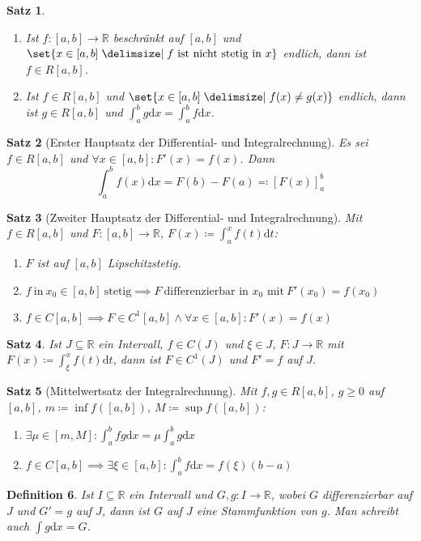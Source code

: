 \documentclass[a4paper]{article}
\newcounter{Sec}
\theoremstyle{marginbreak}
\newtheorem{definition}{Definition}[Sec]
\newtheorem{satz}[definition]{Satz}
\renewcommand{\d}[1]{\mathrm{d}#1}
\begin{document}
	\begin{satz}
		\begin{enumerate}[label=(\alph*)]
			\item Ist $f\colon[a,b]\to\mathbb{R}$ beschränkt auf $[a,b]$ und
				$\set{x\in[a,b]\given f~\text{ist nicht stetig in}~x}$ endlich,
				dann ist $f\in R[a,b]$.
			\item Ist $f\in R[a,b]$ und $\set{x\in[a,b]\given f(x)\neq g(x)}$ endlich,
			dann ist $g\in R[a,b]$ und $\int_a^bg\d{x}=\int_a^bf\d{x}$.
		\end{enumerate}
	\end{satz}
	\begin{satz}[Erster Hauptsatz der Differential- und Integralrechnung]
		Es sei $f\in R[a,b]$ und $\forall x\in [a,b]:F'(x)=f(x)$. Dann
		\[ \int_a^bf(x)\d{x}=F(b)-F(a)\eqqcolon [F(x)]_a^b \]
	\end{satz}
	\begin{satz}[Zweiter Hauptsatz der Differential- und Integralrechnung]
		Mit $f\in R[a,b]$ und $F\colon[a,b]\to\mathbb{R}$, $F(x)\coloneqq\int_a^xf(t)\d{t}$:
		\begin{enumerate}[label=(\alph*)]
			\item $F$ ist auf $[a,b]$ Lipschitzstetig.
			\item $f~\text{in}~x_0\in[a,b]~\text{stetig}\implies F~\text{differenzierbar in $x_0$ mit}~F'(x_0)=f(x_0)$
			\item $f\in C[a,b]\implies F\in C^1[a,b]\wedge\forall x\in[a,b]:F'(x)=f(x)$
		\end{enumerate}
	\end{satz}
	\begin{satz}
		Ist $J\subseteq\mathbb{R}$ ein Intervall, $f\in C(J)$ und $\xi\in J$,
		$F\colon J\to\mathbb{R}$ mit $F(x)\coloneqq\int_\xi^xf(t)\d{t}$, dann ist
		$F\in C^1(J)$ und $F'=f$ auf $J$.
	\end{satz}
	\begin{satz}[Mittelwertsatz der Integralrechnung]
		Mit $f,g\in R[a,b]$, $g\geq0$ auf $[a,b]$, $m\coloneqq\inf f([a,b])$,
		$M\coloneqq\sup f([a,b])$:
		\begin{enumerate}[label=(\alph*)]
			\item $\exists\mu\in[m,M]:\int_a^bfg\d{x}=\mu\int_a^bg\d{x}$
			\item $f\in C[a,b]\implies\exists\xi\in[a,b]:\int_a^bf\d{x}=f(\xi)(b-a)$
		\end{enumerate}
	\end{satz}
	\begin{definition}
		Ist $I\subseteq\mathbb{R}$ ein Intervall und $G,g\colon I\to\mathbb{R}$, wobei
		$G$ differenzierbar auf $J$ und $G'=g$ auf $J$, dann ist $G$ auf $J$ eine
		Stammfunktion von $g$. Man schreibt auch $\int g\d{x}=G$.
	\end{definition}
\end{document}
